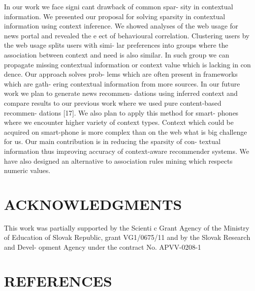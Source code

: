 \documentclass[10pt]{extarticle}
\begin{document}
\begin{multicols}{2}
In our work we face signi cant drawback of common spar-
sity in contextual information.  We presented our proposal
for solving sparsity in contextual information using context
inference.   We  showed  analyses  of  the  web  usage  for  news
portal  and  revealed  the  e ect  of  behavioural  correlation.
Clustering  users  by  the  web  usage  splits  users  with  simi-
lar  preferences  into  groups  where  the  association  between
context  and  need  is  also  similar.    In  such  group  we  can
propagate missing contextual information or context value
which is lacking in con dence.  Our approach solves prob-
lems which are often present in frameworks which are gath-
ering contextual information from more sources.
In our future work we plan to generate news recommen-
dations  using  inferred  context  and  compare  results  to  our
previous work where we used pure content-based recommen-
dations [17].  We also plan to apply this method for smart-
phones where we encounter higher variety of context types.
Context  which  could  be  acquired  on  smart-phone  is  more
complex than on the web what is big challenge for us.
Our main contribution is in reducing the sparsity of con-
textual information thus improving accuracy of context-aware
recommender systems.  We have also designed an alternative
to association rules mining which respects numeric values.

\section{ACKNOWLEDGMENTS}

This work was partially supported by the Scienti c Grant
Agency  of  the  Ministry  of  Education  of  Slovak  Republic,
grant VG1/0675/11 and by the Slovak Research and Devel-
opment Agency under the contract No.  APVV-0208-1

\section{REFERENCES}

\end{multicols}
\end{document}
